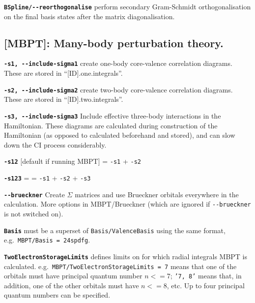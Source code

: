 \documentclass[a4paper,11pt]{article}
\newcommand{\option}[1]{\smallskip\noindent\textbf{\texttt{#1}}}
\newcommand{\code}[1]{\texttt{#1}}
\begin{document}
\option{BSpline/-{}-reorthogonalise} perform secondary Gram-Schmidt orthogonalisation on the final basis states after the matrix diagonalisation.


\subsection{[MBPT]: Many-body perturbation theory.}

\option{-s1, -{}-include-sigma1} create one-body core-valence correlation diagrams. These are stored in ``[ID].one.integrals''.

\option{-s2, -{}-include-sigma2} create two-body core-valence correlation diagrams. These are stored in ``[ID].two.integrals''.

\option{-s3, -{}-include-sigma3} Include effective three-body interactions in the Hamiltonian. These diagrams are calculated during construction of the Hamiltonian (as opposed to calculated beforehand and stored), and can slow down the CI process considerably.

\option{-s12} [default if running MBPT] = \texttt{-s1} + \texttt{-s2}

\option{-s123} = = \texttt{-s1} + \texttt{-s2} + \texttt{-s3}

\option{-{}-brueckner} Create $\Sigma$ matrices and use Brueckner orbitals everywhere in the calculation. More options in MBPT/Brueckner (which are ignored if \texttt{-{}-brueckner} is not switched on).

\option{Basis} must be a superset of \code{Basis/ValenceBasis} using the same format, e.g.~\code{MBPT/Basis = 24spdfg}.

\option{TwoElectronStorageLimits} defines limits on for which radial integrals MBPT is calculated. e.g.~\code{MBPT/TwoElectronStorageLimits = 7} means that one of the orbitals must have principal quantum number $n <= 7$; \code{'7, 8'} means that, in addition, one of the other orbitals must have $n <= 8$, etc. Up to four principal quantum numbers can be specified.
\end{document}
